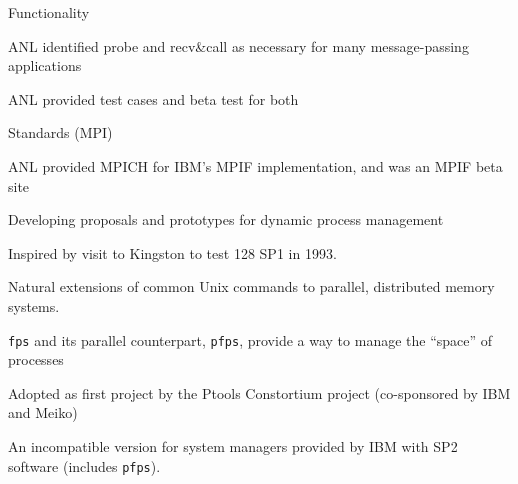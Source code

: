 \begin{small}
\begin{mainpts}
\item Functionality

\begin{secpts}
\item ANL identified probe and recv\&call as necessary for many message-passing
applications

\item ANL provided test cases and beta test for both
\end{secpts}

\item Standards (MPI)
\begin{secpts}
\item ANL provided MPICH for IBM's MPIF implementation, and was an MPIF beta
site 

\item Developing proposals and prototypes for dynamic process management
\end{secpts}
\end{mainpts}

\end{small}
\ve

\begin{small}
\begin{mainpts}
\item Inspired by visit to Kingston to test 128 SP1 in 1993.

\item Natural extensions of common Unix commands to parallel, distributed
memory 
systems.

\item {\tt fps} and its parallel counterpart, {\tt pfps}, provide a
way to manage the ``space'' of processes

\item Adopted as first project by the Ptools Constortium project (co-sponsored by IBM and Meiko)

\item An incompatible version for system managers provided by IBM with SP2
software (includes {\tt pfps}).
\end{mainpts}

\end{small}
\ve

